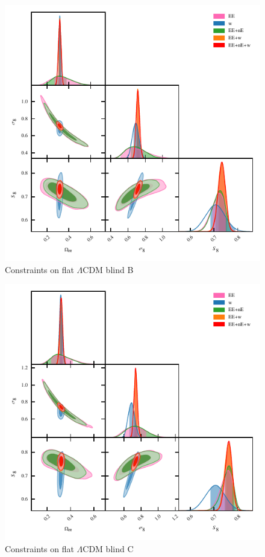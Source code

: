 
\begin{figure}
	\begin{center}
		\includegraphics[width=\columnwidth]{Parameter_Plots/omegam_sigma8_s8_blind_B}
		\caption{Constraints on flat $\Lambda$CDM blind B}
		\label{fig:cosmology-params}
	\end{center}
\end{figure}

\begin{figure}
	\begin{center}
		\includegraphics[width=\columnwidth]{Parameter_Plots/omegam_sigma8_s8_blind_C}
		\caption{Constraints on flat $\Lambda$CDM blind C}
		\label{fig:cosmology-params}
	\end{center}
\end{figure}


